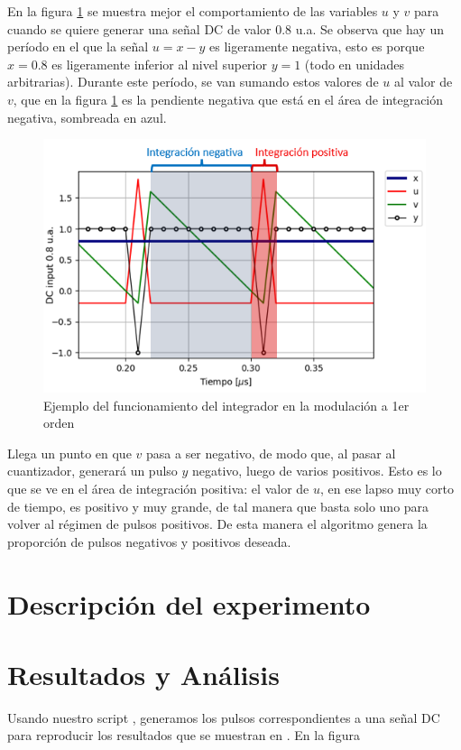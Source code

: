 \documentclass[twoside]{article}
\begin{document}
\begin{multicols}{2}
En la figura \ref{fig:integrador} se muestra mejor el comportamiento de las variables $u$ y $v$ para cuando se quiere generar una señal DC de valor 0.8 u.a. Se observa que hay un período en el que la señal $u=x-y$ es ligeramente negativa, esto es porque $x=0.8$ es ligeramente inferior al nivel superior $y=1$ (todo en unidades arbitrarias). Durante este período, se van sumando estos valores de $u$ al valor de $v$, que en la figura \ref{fig:integrador} es la pendiente negativa que está en el área de integración negativa, sombreada en azul.


\begin{figure}[H]
\centering
\includegraphics[width=\linewidth]{figuras/integracion.png}
\caption{Ejemplo del funcionamiento del integrador en la modulación a 1er orden}
\label{fig:integrador}
\end{figure}

Llega un punto en que $v$ pasa a ser negativo, de modo que, al pasar al cuantizador, generará un pulso $y$ negativo, luego de varios positivos. Esto es lo que se ve en el área de integración positiva: el valor de $u$, en ese lapso muy corto de tiempo, es positivo y muy grande, de tal manera que basta solo uno para volver al régimen de pulsos positivos. De esta manera el algoritmo genera la proporción de pulsos negativos y positivos deseada.



\section{Descripción del experimento}



\section{Resultados y Análisis}

Usando nuestro script \cite{script}, generamos los pulsos correspondientes a una señal DC para reproducir los resultados que se muestran en \cite{aziz1996}. En la figura 







\end{multicols}





\nocite{*} %
\end{document}
